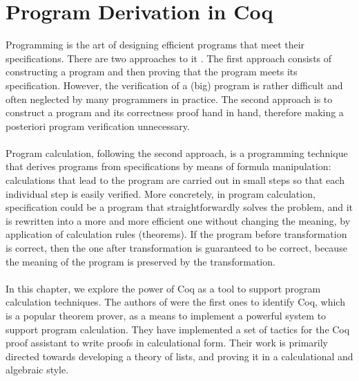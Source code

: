 \chapter{Program Derivation in Coq}

Programming is the art of designing efficient programs that meet their specifications. There are two approaches  to it \cite{tesson2010program}. The first approach consists of constructing a program and then proving that the program meets its specification. However, the verification of a (big) program is rather difficult and often neglected by many programmers in practice. The second approach is to construct a program and its correctness proof hand in hand, therefore making a posteriori program verification unnecessary. \\\\
Program calculation, following the second approach, is a programming technique that derives programs from specifications by means of formula manipulation: calculations that lead to the program are carried out in small steps so that each individual step is easily verified. More concretely, in program calculation, specification could be a program that straightforwardly solves the problem, and it is rewritten into a more and more efficient one without changing the meaning, by application of calculation rules (theorems). If the program before transformation is correct, then the one after transformation is guaranteed to be correct, because the meaning of the program is preserved by the transformation. \\\\
In this chapter, we explore the power of Coq as a tool to support program calculation techniques. The authors of \cite{tesson2010program} were the first ones to identify Coq, which is a popular theorem prover, as a means to implement a powerful system to support program calculation. They have implemented a set of tactics for the Coq proof assistant to write proofs in calculational form. Their work is primarily directed towards developing a theory of lists, and proving it in a calculational and algebraic style.

